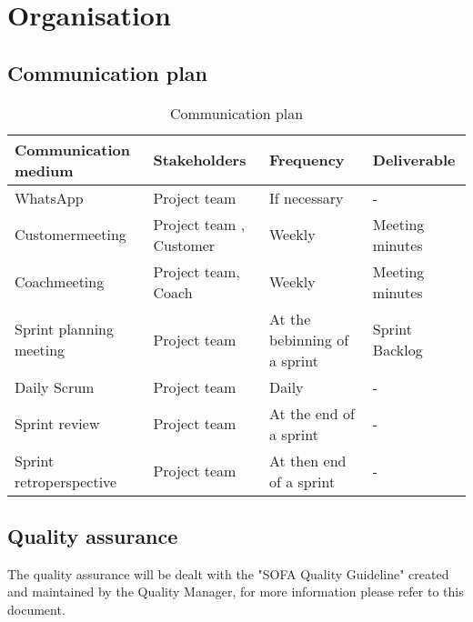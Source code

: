 \section{Organisation}

    \subsection{Communication plan}
    \begin{table}[H]
        \begin{tabularx}{\textwidth}{X X X X}
        	\hline
            \textbf{Communication medium} & \textbf{Stakeholders} & \textbf{Frequency} & \textbf{Deliverable} \\ \hline \hline
            WhatsApp & Project team & If necessary & - \\ \hline
            Customermeeting & Project team , Customer & Weekly & Meeting minutes \\ \hline
            Coachmeeting & Project team, Coach & Weekly & Meeting minutes \\ \hline
            Sprint planning meeting & Project team & At the bebinning of a sprint & Sprint Backlog \\ \hline
            Daily Scrum & Project team & Daily & - \\ \hline 
            Sprint review & Project team & At the end of a sprint & - \\ \hline
            Sprint retroperspective & Project team & At then end of a sprint & - \\ \hline
        \end{tabularx}
        \caption{Communication plan}
    \end{table}

    \subsection{Quality assurance}
    The quality assurance will be dealt with the "SOFA Quality Guideline" created and maintained by the Quality Manager, for 
    more information please refer to this document.


